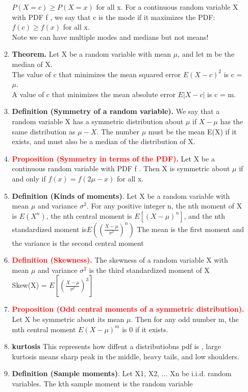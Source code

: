 \documentclass[11pt]{article}
\begin{document}
\begin{enumerate}
\begin{enumerate}
	$P(X = c) \ge P(X = x)$ for all x. For a continuous random variable X with PDF f , we say that c is the mode
	if it maximizes the PDF: $f(c) \ge f (x)$ for all x.\\
	Note we can have multiple modes and medians but not means!
	\item \textbf{Theorem. }Let X be a random variable with mean $\mu$, and let m be the median of X.
	\\The value of c that minimizes the mean squared error $E(X - c)^2$ is c = $\mu$.
	\\A value of c that minimizes the mean absolute error $E|X - c|$ is c = m.
	\item\textbf{ Definition (Symmetry of a random variable). }We say that a random variable X has a symmetric distribution
	about $\mu$ if $X-\mu$ has the same distribution as $\mu - X$. The number $\mu$ must be the mean E(X) if it exists, and
	must also be a median of the distribution of X.
	\item \textcolor{red}{\textbf{Proposition (Symmetry in terms of the PDF).}} Let X be a continuous random variable with PDF f . Then X
	is symmetric about $\mu$ if and only if $f (x) = f (2\mu - x)$ for all x.
	\item\textbf{ Definition (Kinds of moments)}. Let X be a random variable with mean $\mu$ and variance $\sigma^2$. For any positive
	integer n, the nth moment of X is $E(X^n)$, the nth central moment is $E[(X-\mu)^n]$, and the nth standardized
	moment is$E((\frac{X-\mu}{\sigma^2})^n)$
	The mean is the first moment and the variance is the second central moment
	\item \textcolor{red}{\textbf{ Definition (Skewness).}} The skewness of a random variable X with mean $\mu$ and variance $\sigma^2$ is the third
	standardized moment of X \\
	Skew(X) = $E[(\frac{X-\mu}{\sigma^2})^3]$
	\item \textcolor{red}{\textbf{Proposition (Odd central moments of a symmetric distribution). }}Let X be symmetric about its mean $\mu$. Then
	for any odd number m, the mth central moment $E(X -\mu)^m$ is 0 if it exists.
	\item \textbf{kurtosis} This represents how diffent a distributiobns pdf is , large kurtosis means sharp peak in the middle, heavy tails, and low shoulders.
	\item \textbf{Definition (Sample moments)}. Let X1, X2, ... Xn be i.i.d. random variables. The kth sample moment is the random variable\\

\end{enumerate}
\end{enumerate}
\end{document}
